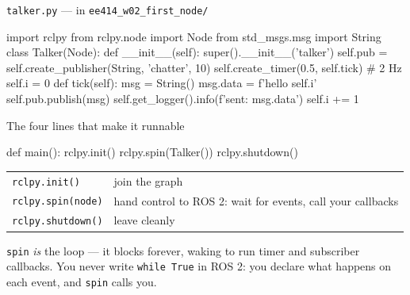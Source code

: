 \documentclass[aspectratio=169]{beamer}
\begin{document}
\begin{frame}[fragile]{\texttt{talker.py} --- in \texttt{ee414\_w02\_first\_node/}}
  \begin{pycodes}
import rclpy
from rclpy.node import Node
from std_msgs.msg import String
class Talker(Node):
    def __init__(self):
        super().__init__('talker')
        self.pub = self.create_publisher(String, 'chatter', 10)
        self.create_timer(0.5, self.tick)      # 2 Hz
        self.i = 0
    def tick(self):
        msg = String()
        msg.data = f'hello {self.i}'
        self.pub.publish(msg)
        self.get_logger().info(f'sent: {msg.data}')
        self.i += 1
  \end{pycodes}
\end{frame}

\begin{frame}[fragile]{The four lines that make it runnable}
  \begin{pycodes}
def main():
    rclpy.init()
    rclpy.spin(Talker())
    rclpy.shutdown()
  \end{pycodes}

  \vspace{0.3em}
  \footnotesize
  \begin{center}
  \begin{tabular}{@{}ll@{}}
    \toprule
    \texttt{rclpy.init()} & join the graph \\
    \texttt{rclpy.spin(node)} & hand control to ROS 2: wait for events, call your callbacks \\
    \texttt{rclpy.shutdown()} & leave cleanly \\
    \bottomrule
  \end{tabular}
  \end{center}

  \begin{underhood}
    \footnotesize
    \texttt{spin} \emph{is} the loop --- it blocks forever, waking to run timer and subscriber
    callbacks. You never write \texttt{while True} in ROS 2: you declare what happens on each
    event, and \texttt{spin} calls you.
  \end{underhood}
\end{frame}
\end{document}
